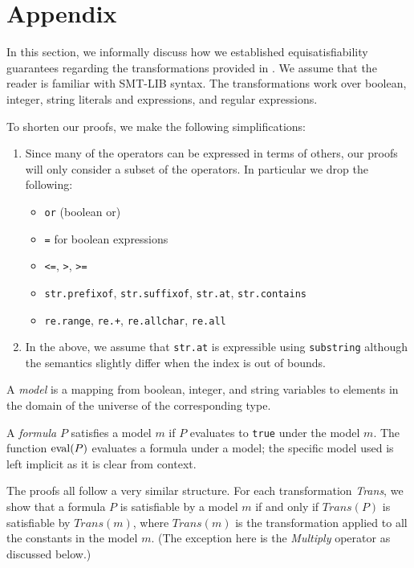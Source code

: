 \section{Appendix}

In this section, we informally discuss how we established
equisatisfiability guarantees regarding the transformations provided in
\fuzzer{}. We assume that the reader is familiar with SMT-LIB
syntax. The transformations work over boolean, integer, string
literals and expressions, and regular expressions.

To shorten our proofs, we make the following simplifications:
\begin{enumerate}
  \item
    Since many of the operators can be expressed in terms of others,
    our proofs will only consider a subset of the operators. In
    particular we drop the following:
    \begin{itemize}
      \item \texttt{or} (boolean or)
      \item \texttt{=} for boolean expressions
      \item \texttt{<=}, \texttt{>}, \texttt{>=}
      \item \texttt{str.prefixof}, \texttt{str.suffixof}, \texttt{str.at}, \texttt{str.contains}
      \item \texttt{re.range}, \texttt{re.+}, \texttt{re.allchar}, \texttt{re.all}
    \end{itemize}

  \item
    In the above, we assume that \texttt{str.at} is expressible using
    \texttt{substring} although the semantics slightly differ when the index is
    out of bounds.
\end{enumerate}

\begin{definition}
  A \emph{model} is a mapping from boolean, integer, and string variables to
elements in the domain of the universe of the corresponding type.
\end{definition}

\begin{definition}
  A \emph{formula} $P$ satisfies a model $m$ if $P$ evaluates to
  \texttt{true} under the model $m$. The function $\operatorname{eval} (P)$
  evaluates a formula under a model; the specific model used is left
  implicit as it is clear from context.
\end{definition}

The proofs all follow a very similar structure. For each
transformation \textit{Trans}, we show that a formula $P$ is
satisfiable by a model $m$ if and only if $\textit{Trans}(P)$ is
satisfiable by $\textit{Trans}(m)$, where $\textit{Trans}(m)$ is the
transformation applied to all the constants in the model $m$. (The
exception here is the \textit{Multiply} operator as discussed below.)

